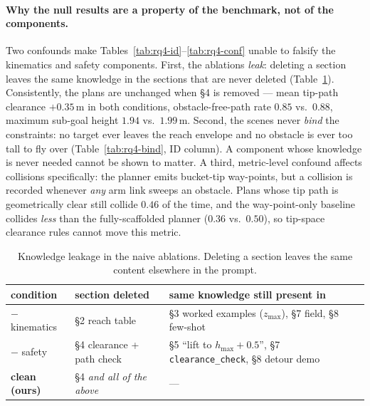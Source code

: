 \paragraph{Why the null results are a property of the benchmark, not of the components.}
Two confounds make Tables~\ref{tab:rq4-id}--\ref{tab:rq4-conf} unable to falsify the kinematics
and safety components. First, the ablations \emph{leak}: deleting a section leaves the same
knowledge in the sections that are never deleted (Table~\ref{tab:rq4-leak}). Consistently, the
plans are unchanged when \S4 is removed --- mean tip-path clearance $+0.35$\,m in both conditions,
obstacle-free-path rate $0.85$ vs.\ $0.88$, maximum sub-goal height $1.94$ vs.\ $1.99$\,m.
Second, the scenes never \emph{bind} the constraints: no target ever leaves the reach envelope and
no obstacle is ever too tall to fly over (Table~\ref{tab:rq4-bind}, ID column). A component whose
knowledge is never needed cannot be shown to matter.
A third, metric-level confound affects collisions specifically: the planner emits bucket-tip
way-points, but a collision is recorded whenever \emph{any} arm link sweeps an obstacle. Plans
whose tip path is geometrically clear still collide $0.46$ of the time, and the way-point-only
baseline collides \emph{less} than the fully-scaffolded planner ($0.36$ vs.\ $0.50$), so tip-space
clearance rules cannot move this metric.

\begin{table}[t]\centering
\caption{Knowledge leakage in the naive ablations. Deleting a section leaves the same content
elsewhere in the prompt.}\label{tab:rq4-leak}
\begin{tabular}{lll}
\toprule
condition & section deleted & same knowledge still present in \\
\midrule
$-$ kinematics & \S2 reach table & \S3 worked examples ($z_{\max}$), \S7 field, \S8 few-shot \\
$-$ safety     & \S4 clearance + path check & \S5 ``lift to $h_{\max}{+}0.5$'', \S7 \texttt{clearance\_check}, \S8 detour demo \\
\textbf{clean (ours)} & \S4 \emph{and all of the above} & --- \\
\bottomrule
\end{tabular}
\end{table}

